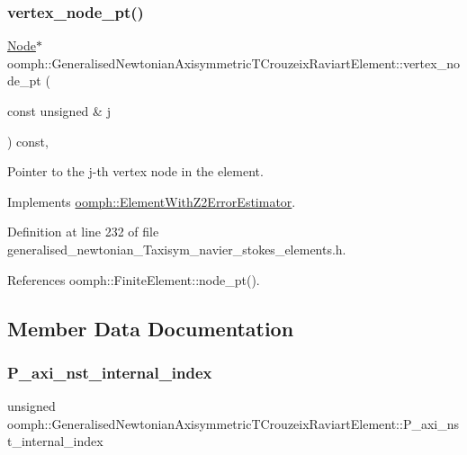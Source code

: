 \subsubsection{\texorpdfstring{vertex\+\_\+node\+\_\+pt()}{vertex\_node\_pt()}}
{\footnotesize\ttfamily \hyperlink{classoomph_1_1Node}{Node}$\ast$ oomph\+::\+Generalised\+Newtonian\+Axisymmetric\+T\+Crouzeix\+Raviart\+Element\+::vertex\+\_\+node\+\_\+pt (\begin{DoxyParamCaption}\item[{const unsigned \&}]{j }\end{DoxyParamCaption}) const\hspace{0.3cm}{\ttfamily [inline]}, {\ttfamily [virtual]}}



Pointer to the j-\/th vertex node in the element. 



Implements \hyperlink{classoomph_1_1ElementWithZ2ErrorEstimator_a0eedccc33519f852c5dc2055ddf2774b}{oomph\+::\+Element\+With\+Z2\+Error\+Estimator}.



Definition at line 232 of file generalised\+\_\+newtonian\+\_\+\+Taxisym\+\_\+navier\+\_\+stokes\+\_\+elements.\+h.



References oomph\+::\+Finite\+Element\+::node\+\_\+pt().



\subsection{Member Data Documentation}
\mbox{\label{classoomph_1_1GeneralisedNewtonianAxisymmetricTCrouzeixRaviartElement_aa6cb9966351b7d964fde3efec3932753}} 
\subsubsection{\texorpdfstring{P\+\_\+axi\+\_\+nst\+\_\+internal\+\_\+index}{P\_axi\_nst\_internal\_index}}
{\footnotesize\ttfamily unsigned oomph\+::\+Generalised\+Newtonian\+Axisymmetric\+T\+Crouzeix\+Raviart\+Element\+::\+P\+\_\+axi\+\_\+nst\+\_\+internal\+\_\+index\hspace{0.3cm}{\ttfamily [protected]}}

